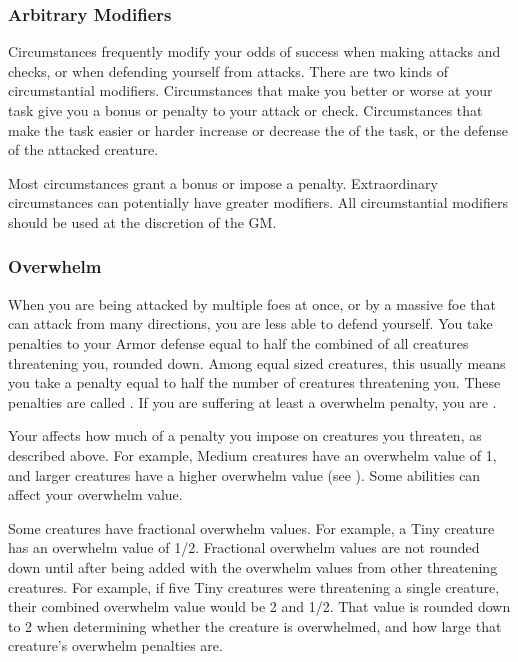         \subsubsection{Arbitrary Modifiers}

            Circumstances frequently modify your odds of success when making attacks and checks, or when defending yourself from attacks.
            There are two kinds of circumstantial modifiers.
            Circumstances that make you better or worse at your task give you a bonus or penalty to your attack or check.
            Circumstances that make the task easier or harder increase or decrease the  of the task, or the defense of the attacked creature.

            Most circumstances grant a  bonus or impose a  penalty.
            Extraordinary circumstances can potentially have greater modifiers.
            All circumstantial modifiers should be used at the discretion of the GM.\@

        \subsubsection{Overwhelm}\label{Overwhelm}
            When you are being attacked by multiple foes at once, or by a massive foe that can attack from many directions, you are less able to defend yourself.
            You take penalties to your Armor defense equal to half the combined  of all creatures threatening you, rounded down.
            Among equal sized creatures, this usually means you take a penalty equal to half the number of creatures threatening you.
            These penalties are called .
            If you are suffering at least a  overwhelm penalty, you are .

            \label{Overwhelm Value} Your  affects how much of a penalty you impose on creatures you threaten, as described above.
            For example, Medium creatures have an overwhelm value of 1, and larger creatures have a higher overwhelm value (see ).
            Some abilities can affect your overwhelm value.

            Some creatures have fractional overwhelm values.
            For example, a Tiny creature has an overwhelm value of 1/2.
            Fractional overwhelm values are not rounded down until after being added with the overwhelm values from other threatening creatures.
            For example, if five Tiny creatures were threatening a single creature, their combined overwhelm value would be 2 and 1/2.
            That value is rounded down to 2 when determining whether the creature is overwhelmed, and how large that creature's overwhelm penalties are.

